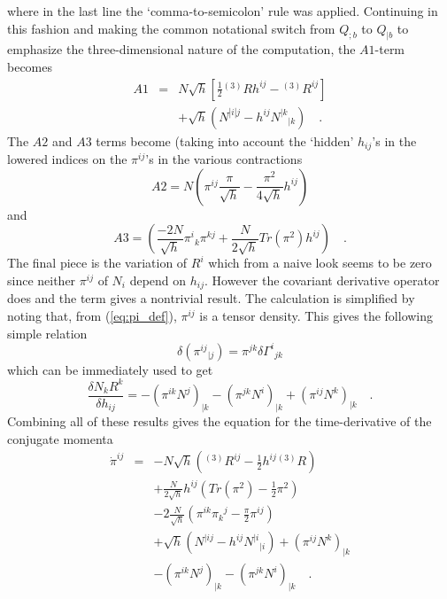 \documentclass[twocolumn]{article}
\def\.{{\quad .}}
\begin{document}
where in the last line the `comma-to-semicolon' rule was applied.
Continuing in this fashion and making the common notational switch
from $Q_{;b}$ to $Q_{|b}$ to emphasize the three-dimensional
nature of the computation, the $A1$-term becomes
\begin{eqnarray*}
   A1 & = & N \sqrt{h} \left[ \frac{1}{2} {}^{(3)}R h^{ij} - {}^{(3)}R^{ij} \right] \\
      &   &  + \sqrt{h} \left( N^{|i|j} - h^{ij} {N^{|k}}_{|k} \right) \.
\end{eqnarray*}
The $A2$ and $A3$ terms become (taking into account the `hidden' $h_{ij}$'s in
the lowered indices on the $\pi^{ij}$'s in the various contractions
\[
   A2 = N \left( \pi^{ij} \frac{\pi}{\sqrt{h}} - \frac{\pi^2}{4 \sqrt{h}} h^{ij}
          \right)
\]
and
\[
   A3 = \left(
               \frac{-2 N}{\sqrt{h}} {\pi^i}_{k} \pi^{kj} +
               \frac{N}{2 \sqrt{h}}  Tr\left( \pi^2 \right) h^{ij}
        \right) \.
\]
The final piece is the variation of $R^i$ which from a naive look seems to be
zero since neither $\pi^{ij}$ of $N_{i}$ depend on $h_{ij}$.  However the
covariant derivative operator does and the term gives a nontrivial result.
The calculation is simplified by noting that, from (\ref{eq:pi_def}), $\pi^{ij}$
is a tensor density.
This gives the following simple relation
\[
   \delta \left( {\pi^{ij}}_{|j} \right)= \pi^{jk} \delta {\Gamma^i}_{jk}
\]
which can be immediately used to get
\[
    \frac{\delta N_k R^k}{\delta h_{ij}}
= - \left( \pi^{ik} N^j \right)_{|k}
  - \left( \pi^{jk} N^i \right)_{|k}
  + \left( \pi^{ij} N^k \right)_{|k} \.
\]
Combining all of these results gives the equation for the time-derivative of
the conjugate momenta
\begin{eqnarray*}
{\dot \pi}^{ij} & = &
  - N \sqrt{h} \left( {}^{(3)}R^{ij} - \frac{1}{2} h^{ij} {}^{(3)}R \right) \\
  & &
  + \frac{N}{2\sqrt{h}} h^{ij} \left(
                                      Tr\left( \pi^2\right) - \frac{1}{2} \pi^2
                               \right) \\
  & &
  - 2 \frac{N}{\sqrt{h}} \left(
                                \pi^{ik}{\pi_k}^j - \frac{\pi}{2} \pi^{ij}
                         \right) \\
  & &
  + \sqrt{h} \left( N^{|ij} - h^{ij} {N^{|i}}_{|i} \right)
  + \left( \pi^{ij} N^k \right)_{|k} \\
  & &
  - \left( \pi^{ik} N^j \right)_{|k}
  - \left( \pi^{jk} N^i \right)_{|k} \.
\end{eqnarray*}
\end{document}
